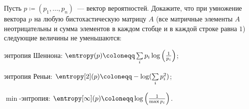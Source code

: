 Пусть $p \coloneqq (p_1, \dots, p_n)$~--- вектор вероятностей. Докажите, что при умножение вектора $p$ на
любую бистохастическую матрицу $A$ (все матричные элементы $A$ неотрицательны и сумма элементов в каждом
стобце и в каждой строке равна $1$) следующие величины не уменьшаются:
\begin{enumcyr}
    \item энтропия Шеннона: $\entropy(p) \coloneqq \sum\limits_{i} p_i \log\left(\frac{1}{p_i}\right)$;
	\item энтропия Реньи: $\entropy[2](p) \coloneqq -\log(\sum\limits_{i} p_i^2)$;
    \item $\min$-энтропия: $\entropy[\infty](p) \coloneqq \log\left(\frac{1}{\max p_i}\right)$.
\end{enumcyr}
